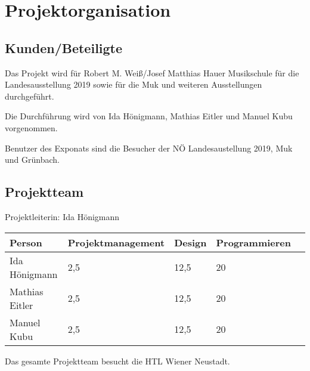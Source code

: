 \documentclass[a4paper]{scrartcl}
\begin{document}
\section{Projektorganisation}
\subsection{Kunden/Beteiligte}
Das Projekt wird für Robert M. Weiß/Josef Matthias Hauer Musikschule für die Landesausstellung 2019 sowie für die Muk und weiteren Ausstellungen durchgeführt. 

\noindent Die Durchführung wird von Ida Hönigmann, Mathias Eitler und Manuel Kubu vorgenommen.

\noindent Benutzer des Exponats sind die Besucher der NÖ Landesaustellung 2019, Muk und Grünbach.

\subsection{Projektteam}
Projektleiterin: Ida Hönigmann

\begin{center}
	\begin{tabular}{|l|l|l|l|l|}
		\hline
		\textbf{Person} & \textbf{Projektmanagement} & \textbf{Design} & \textbf{Programmieren} \\
		\hline
		Ida Hönigmann & 2,5 & 12,5 & 20 \\
		Mathias Eitler & 2,5 & 12,5 & 20 \\
		Manuel Kubu & 2,5 & 12,5 & 20 \\
		\hline
	\end{tabular}
\end{center} 
Das gesamte Projektteam besucht die HTL Wiener Neustadt.
\end{document}
